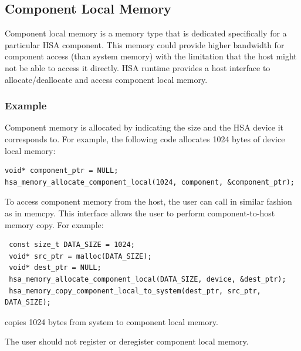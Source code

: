 \documentclass[draft]{book}
\begin{document}


\hypertarget{device-memory}{}\subsection{Component Local Memory}
\label{device-memory}

Component local memory is a memory type that is dedicated specifically for a
particular HSA component. This memory could provide higher bandwidth for
component access (than system memory) with the limitation that the host might
not be able to access it directly. HSA runtime provides a host interface to
allocate/deallocate and access component local memory.



\hypertarget{device-memory-usage}{}\subsubsection{Example}\label{device-memory-usage}

Component memory is allocated by indicating the size and the HSA device it
corresponds to. For example, the following code allocates 1024 bytes of device
local memory:

\begin{lstlisting}
void* component_ptr = NULL;
hsa_memory_allocate_component_local(1024, component, &component_ptr);
\end{lstlisting}

To access component memory from the host, the user can call
 in similar fashion as in
memcpy. This interface allows the user to perform component-to-host memory
copy. For example:

\begin{lstlisting}
 const size_t DATA_SIZE = 1024;
 void* src_ptr = malloc(DATA_SIZE);
 void* dest_ptr = NULL;
 hsa_memory_allocate_component_local(DATA_SIZE, device, &dest_ptr);
 hsa_memory_copy_component_local_to_system(dest_ptr, src_ptr, DATA_SIZE);
\end{lstlisting}

copies 1024 bytes from system to component local memory.

The user should not register or deregister component local memory.
\end{document}
